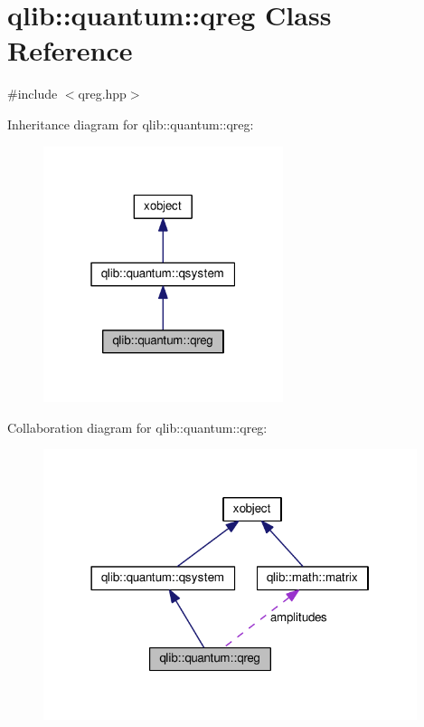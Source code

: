 \hypertarget{classqlib_1_1quantum_1_1qreg}{}\section{qlib\+:\+:quantum\+:\+:qreg Class Reference}
\label{classqlib_1_1quantum_1_1qreg}


{\ttfamily \#include $<$qreg.\+hpp$>$}



Inheritance diagram for qlib\+:\+:quantum\+:\+:qreg\+:\nopagebreak
\begin{figure}[H]
\begin{center}
\leavevmode
\includegraphics[width=199pt]{classqlib_1_1quantum_1_1qreg__inherit__graph}
\end{center}
\end{figure}


Collaboration diagram for qlib\+:\+:quantum\+:\+:qreg\+:\nopagebreak
\begin{figure}[H]
\begin{center}
\leavevmode
\includegraphics[width=310pt]{classqlib_1_1quantum_1_1qreg__coll__graph}
\end{center}
\end{figure}
